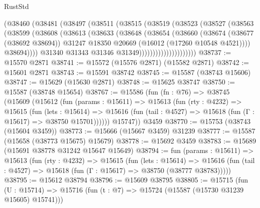 \begin{lexlean}{RustStd}
\begin{coremodule}
                        (@38460
                          (@38481
                            (@38497
                              (@38511
                                (@38515
                                  (@38519
                                    (@38523
                                      (@38527
                                        (@38563
                                          (@38599
                                            (@38608
                                              (@38613
                                                (@38633
                                                  (@38648
                                                    (@38654
                                                      (@38660
                                                        (@38674
                                                          (@38677 (@38692 @38694))
                                                          @31247
                                                          @18350
                                                          @20669
                                                          (@16012 (@17260 @10548 @4521))))
                                                      @38694))))
                                              @31340
                                              @31343
                                              @31346
                                              @31349)))))))))))))))))))))
@38737 := @15570 @2871
@38741 := @15572 (@15576 @2871) (@15582 @2871)
@38742 := @15601 @2871
@38743 := @15591 @38742
@38745 := @15587 (@38743 @15606)
@38747 := @15629 (@15630 @2871)
@38748 := @15625 @38747
@38750 := @15587 (@38748 @15654)
@38767 := @15586
    (fun (fn : @76) =>
    @38745
      (@15609
        (@15612
          (fun (params : @15611) =>
          @15613
            (fun (rty : @4232) =>
            @15615
              (fun (lets : @15614) =>
              @15616 (fun (tail : @4527) => @15618 (fun (Γ : @15617) => @38750 @15701))))))
        @15747))
    @3459
@38770 := @15753 (@38743 (@15604 @3459))
@38773 := @15666 (@15667 @3459) @31239
@38777 := @15587 (@15658 (@38773 @15675) @15679)
@38778 := @15692 @3459
@38783 := @15689 (@15691 @38778 @31242 @15647 @15649)
@38794 := fun (params : @15611) =>
  @15613
    (fun (rty : @4232) =>
    @15615
      (fun (lets : @15614) =>
      @15616 (fun (tail : @4527) => @15618 (fun (Γ : @15617) => @38750 (@38777 @38783)))))
@38795 := @15612 @38794
@38796 := @15609 @38795
@38805 := @15715
    (fun (U : @15714) => @15716 (fun (t : @7) => @15724 (@15587 (@15730 @31239 @15605) @15741)))

\end{coremodule}
\end{lexlean}
